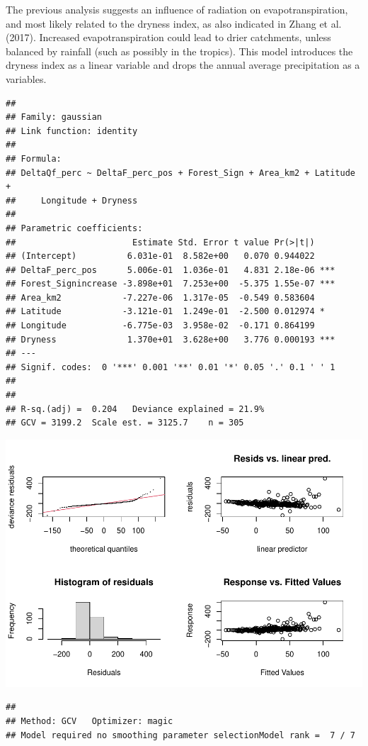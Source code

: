 \documentclass[]{elsarticle} %
\begin{document}
The previous analysis suggests an influence of radiation on
evapotranspiration, and most likely related to the dryness index, as
also indicated in Zhang et al. (2017). Increased evapotranspiration
could lead to drier catchments, unless balanced by rainfall (such as
possibly in the tropics). This model introduces the dryness index as a
linear variable and drops the annual average precipitation as a
variables.

\begin{verbatim}
## 
## Family: gaussian 
## Link function: identity 
## 
## Formula:
## DeltaQf_perc ~ DeltaF_perc_pos + Forest_Sign + Area_km2 + Latitude + 
##     Longitude + Dryness
## 
## Parametric coefficients:
##                       Estimate Std. Error t value Pr(>|t|)    
## (Intercept)          6.031e-01  8.582e+00   0.070 0.944022    
## DeltaF_perc_pos      5.006e-01  1.036e-01   4.831 2.18e-06 ***
## Forest_Signincrease -3.898e+01  7.253e+00  -5.375 1.55e-07 ***
## Area_km2            -7.227e-06  1.317e-05  -0.549 0.583604    
## Latitude            -3.121e-01  1.249e-01  -2.500 0.012974 *  
## Longitude           -6.775e-03  3.958e-02  -0.171 0.864199    
## Dryness              1.370e+01  3.628e+00   3.776 0.000193 ***
## ---
## Signif. codes:  0 '***' 0.001 '**' 0.01 '*' 0.05 '.' 0.1 ' ' 1
## 
## 
## R-sq.(adj) =  0.204   Deviance explained = 21.9%
## GCV = 3199.2  Scale est. = 3125.7    n = 305
\end{verbatim}

\includegraphics{Forest_and_Water_files/figure-latex/model4-1.pdf}

\begin{verbatim}
## 
## Method: GCV   Optimizer: magic
## Model required no smoothing parameter selectionModel rank =  7 / 7
\end{verbatim}
\end{document}
